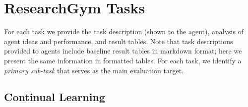 \documentclass[11pt]{article}
\theoremstyle{plain}
\theoremstyle{definition}
\theoremstyle{remark}
\begin{document}
\onecolumn
\section{ResearchGym Tasks} \label{app:tasks}

For each task we provide the task description (shown to the agent), analysis of agent ideas and performance, and result tables. Note that task descriptions provided to agents include baseline result tables in markdown format; here we present the same information in formatted tables. For each task, we identify a \textit{primary sub-task} that serves as the main evaluation target.

\subsection{Continual Learning} \label{app:tasks-cl}
\end{document}

